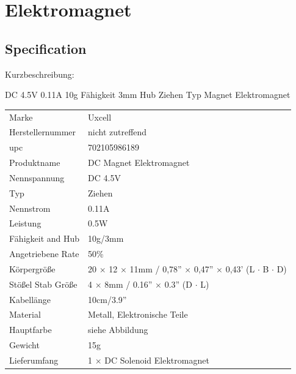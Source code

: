 %
%


\chapter{Elektromagnet}


\section{Specification}

Kurzbeschreibung:



DC 4.5V 0.11A 10g Fähigkeit 3mm Hub Ziehen Typ Magnet Elektromagnet

\medskip

\begin{tabular}{ll}
	Marke             & Uxcell \\
	Herstellernummer  & nicht zutreffend \\
	upc               & 702105986189 \\	
	Produktname       & DC Magnet Elektromagnet \\
	Nennspannung      & DC 4.5V \\
	Typ	              & Ziehen \\
	Nennstrom	      & 0.11A \\
	Leistung          & 0.5W \\
	Fähigkeit and Hub & 10g/3mm \\
	Angetriebene Rate & 50\% \\
	Körpergröße	      & 20 $\times$ 12 $\times$ 11mm / 0,78'' $\times$ 0,47'' $\times$ 0,43' (L $\cdot$  B $\cdot$ D) \\
	Stößel Stab Größe & 4 $\times$ 8mm / 0.16'' $\times$ 0.3'' (D $\cdot$ L) \\
	Kabellänge        & 10cm/3.9'' \\
	Material          & Metall, Elektronische Teile \\
	Hauptfarbe        & siehe Abbildung \\
	Gewicht           & 15g \\
	Lieferumfang      & 1 $\times$ DC Solenoid Elektromagnet \\
\end{tabular}


